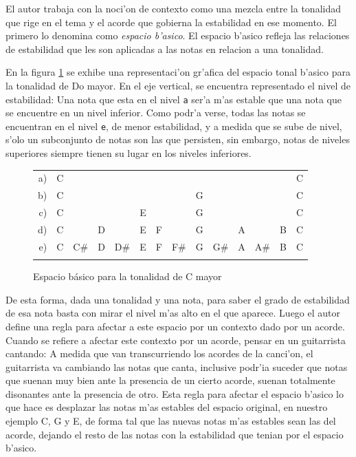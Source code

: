 El autor trabaja con la noci'on de contexto como una mezcla entre la tonalidad que rige en el tema  y el
acorde que gobierna la estabilidad en ese momento. El primero lo denomina como \emph{espacio b'asico}. 
El espacio b'asico refleja las relaciones de estabilidad que les son aplicadas a las notas en relacion a una tonalidad. 

En la figura \ref{fig:basic_space} se exhibe una representaci'on gr'afica del espacio tonal b'asico para la tonalidad de Do mayor. En el eje vertical, se encuentra
representado el nivel de estabilidad: Una nota que esta en el nivel \texttt{a} ser'a m'as estable que una nota que se encuentre en un nivel inferior. Como 
podr'a verse, todas las notas se encuentran en el nivel \texttt{e}, de menor estabilidad, y a medida que se sube de nivel, s'olo un subconjunto de notas son las 
que persisten, sin embargo, notas de niveles superiores siempre tienen su lugar en los niveles inferiores.

\begin{figure}
\begin{center}
\begin{tabular}{r c c c c c c c c c c c c c} 
a) & C &     &   &     &   &   &     &   &     &   &     &   & C\\
b) & C &     &   &     &   &   &     & G &     &   &     &   & C\\
c) & C &     &   &     & E &   &     & G &     &   &     &   & C\\
d) & C &     & D &     & E & F &     & G &     & A &     & B & C\\
e) & C & C\# & D & D\# & E & F & F\# & G & G\# & A & A\# & B & C\\
\newline
\end{tabular}
\caption{ Espacio b\'asico para la tonalidad de C mayor}
\label{fig:basic_space}
\end{center}
\end{figure}


De esta forma, dada una tonalidad y una nota, para saber el grado de estabilidad de esa nota basta con mirar el nivel m'as alto en el que aparece.
Luego el autor define una regla para afectar a este espacio por un contexto dado por un acorde. Cuando se refiere a afectar este contexto por un acorde, pensar
en un guitarrista cantando: A medida que van transcurriendo los acordes de la canci'on, el guitarrista va cambiando las notas que canta, inclusive podr'ia
suceder que notas que suenan muy bien ante la presencia de un cierto acorde, suenan totalmente disonantes ante la presencia de otro. 
Esta regla para afectar el espacio b'asico lo que hace es desplazar las notas m'as estables del espacio original, en nuestro ejemplo C, G y E, de forma tal
que las nuevas notas m'as estables sean las del acorde, dejando el resto de las notas con la estabilidad que tenian por el espacio b'asico. 


